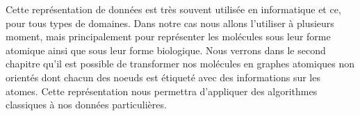 Cette représentation de données est très souvent utilisée en informatique et ce, pour tous types de domaines.
Dans notre cas nous allons l'utiliser à plusieurs moment, mais principalement pour représenter les molécules sous leur forme atomique ainsi que sous leur forme biologique.
Nous verrons dans le second chapitre qu'il est possible de transformer nos molécules en graphes atomiques non orientés dont chacun des noeuds est étiqueté avec des informations sur les atomes.
Cette représentation nous permettra d'appliquer des algorithmes classiques à nos données particulières.





























